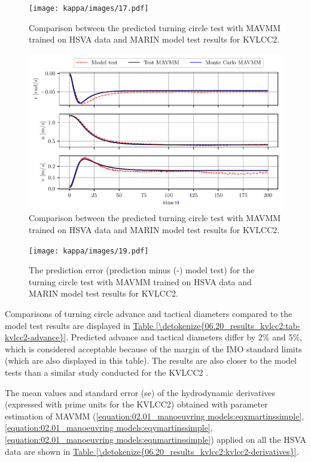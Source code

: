 \begin{figure}[h!]
\centering
\texttt{[image: kappa/images/17.pdf]}
\caption{Comparison between the predicted turning circle test with MAVMM trained on HSVA data and MARIN model test results for KVLCC2.}\label{\detokenize{06.20_results_kvlcc2:fig-kvlcc2-track-plot-testing-sim}}\end{figure}
\begin{figure}[h!]
\centering
\includegraphics[width=1.0\textwidth]{kappa/images/18.pdf}
\caption{Comparison between the predicted turning circle test with MAVMM trained on HSVA data and MARIN model test results for KVLCC2.}\label{\detokenize{06.20_results_kvlcc2:fig-kvlcc2-testing-sim}}\end{figure}
\begin{figure}[h!]
\centering
\texttt{[image: kappa/images/19.pdf]}
\caption{The prediction error (prediction minus (-) model test) for the turning circle test with MAVMM trained on HSVA data and MARIN model test results for KVLCC2.}\label{\detokenize{06.20_results_kvlcc2:fig-kvlcc2-testing-sim-error}}\end{figure} 

Comparisons of turning circle advance and tactical diameters compared to the model test results are displayed in \hyperref[\detokenize{06.20_results_kvlcc2:tab-kvlcc2-advance}]{Table \ref{\detokenize{06.20_results_kvlcc2:tab-kvlcc2-advance}}}. Predicted advance and tactical diameters differ by 2\% and 5\%, which is considered acceptable because of the margin of the IMO standard limits (which are also displayed in this table). The results are also closer to the model tests than a similar study conducted for the KVLCC2 \cite{he_nonparametric_2022}.

\clearpage
The mean values and standard error (se) of the hydrodynamic derivatives (expressed with prime units for the KVLCC2) obtained with parameter estimation of MAVMM (\autoref{equation:02.01_manoeuvring models:eqxmartinssimple}, \autoref{equation:02.01_manoeuvring models:eqymartinssimple}, \autoref{equation:02.01_manoeuvring models:eqnmartinssimple}) applied on all the HSVA data are shown in \hyperref[\detokenize{06.20_results_kvlcc2:kvlcc2-derivatives}]{Table \ref{\detokenize{06.20_results_kvlcc2:kvlcc2-derivatives}}}.

